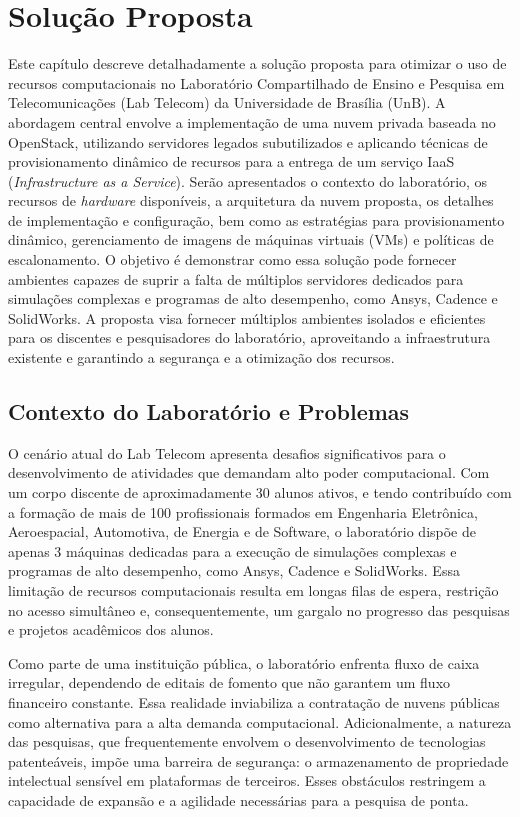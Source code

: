 \chapter{Solução Proposta}

Este capítulo descreve detalhadamente a solução proposta para otimizar o uso de recursos computacionais no Laboratório Compartilhado de Ensino e Pesquisa em Telecomunicações (Lab Telecom) da Universidade de Brasília (UnB). A abordagem central envolve a implementação de uma nuvem privada baseada no OpenStack, utilizando servidores legados subutilizados e aplicando técnicas de provisionamento dinâmico de recursos para a entrega de um serviço IaaS (\textit{Infrastructure as a Service}). Serão apresentados o contexto do laboratório, os recursos de \textit{hardware} disponíveis, a arquitetura da nuvem proposta, os detalhes de implementação e configuração, bem como as estratégias para provisionamento dinâmico, gerenciamento de imagens de máquinas virtuais (VMs) e políticas de escalonamento. O objetivo é demonstrar como essa solução pode fornecer ambientes capazes de suprir a falta de múltiplos servidores dedicados para simulações complexas e programas de alto desempenho, como Ansys, Cadence e SolidWorks. A proposta visa fornecer múltiplos ambientes isolados e eficientes para os discentes e pesquisadores do laboratório, aproveitando a infraestrutura existente e garantindo a segurança e a otimização dos recursos.

\section{Contexto do Laboratório e Problemas}

O cenário atual do Lab Telecom apresenta desafios significativos para o desenvolvimento de atividades que demandam alto poder computacional. Com um corpo discente de aproximadamente 30 alunos ativos, e tendo contribuído com a formação de mais de 100 profissionais formados em Engenharia Eletrônica, Aeroespacial, Automotiva, de Energia e de Software, o laboratório dispõe de apenas 3 máquinas dedicadas para a execução de simulações complexas e programas de alto desempenho, como Ansys, Cadence e SolidWorks. Essa limitação de recursos computacionais resulta em longas filas de espera, restrição no acesso simultâneo e, consequentemente, um gargalo no progresso das pesquisas e projetos acadêmicos dos alunos.

Como parte de uma instituição pública, o laboratório enfrenta fluxo de caixa irregular, dependendo de editais de fomento que não garantem um fluxo financeiro constante. Essa realidade inviabiliza a contratação de nuvens públicas como alternativa para a alta demanda computacional. Adicionalmente, a natureza das pesquisas, que frequentemente envolvem o desenvolvimento de tecnologias patenteáveis, impõe uma barreira de segurança: o armazenamento de propriedade intelectual sensível em plataformas de terceiros. Esses obstáculos restringem a capacidade de expansão e a agilidade necessárias para a pesquisa de ponta.

